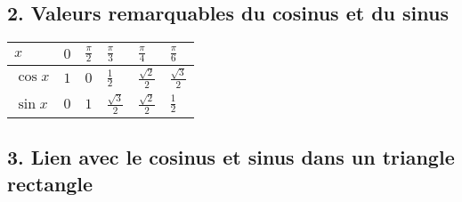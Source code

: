 \documentclass[11pt,a4paper]{article}
\begin{document}
\subsection*{2. Valeurs remarquables du cosinus et du sinus}

\renewcommand{\arraystretch}{2.5}
\begin{tabular}{|Y|Y|Y|Y|Y|Y|}
    \hline
    \large{$x$}       & \Large{$0$} & \Large{$\frac{\pi}{2}$} & \Large{$\frac{\pi}{3}$}      & \Large{$\frac{\pi}{4}$}      & \Large{$\frac{\pi}{6}$}      \\
    \hline
    \large{$\cos{x}$} & \Large{$1$} & \Large{$0$}             & \Large{$\frac{1}{2}$}        & \Large{$\frac{\sqrt{2}}{2}$} & \Large{$\frac{\sqrt{3}}{2}$} \\
    \hline
    \large{$\sin{x}$} & \Large{$0$} & \Large{$1$}             & \Large{$\frac{\sqrt{3}}{2}$} & \Large{$\frac{\sqrt{2}}{2}$} & \Large{$\frac{1}{2}$}        \\
    \hline
\end{tabular}

\subsection*{3. Lien avec le cosinus et sinus dans un triangle rectangle}
\end{document}
